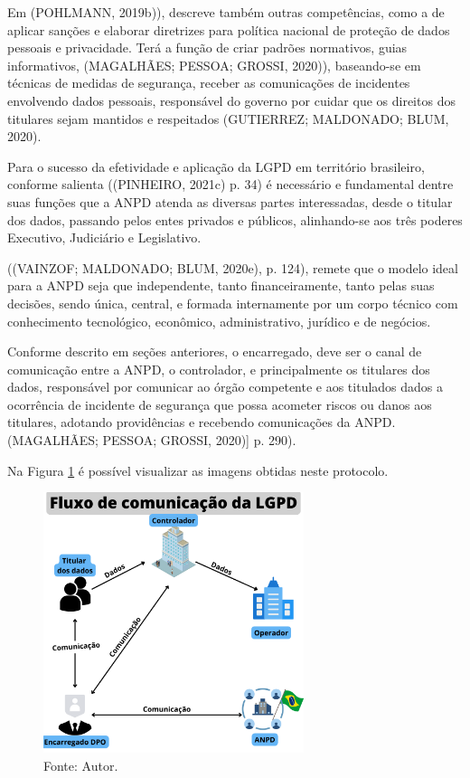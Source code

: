 \documentclass[
	12pt,				%
	openright,			%
	oneside,			%
	a4paper,			%
	english,			%
	french,				%
	spanish,			%
	brazil,				%
	]{abntex2}
\begin{document}
Em (POHLMANN, 2019b)), descreve também outras competências, como a de aplicar sanções e elaborar diretrizes para política nacional de proteção de dados pessoais e privacidade. Terá a função de criar padrões normativos, guias informativos,      (MAGALHÃES; PESSOA; GROSSI, 2020)), baseando-se em técnicas de medidas de segurança, receber as comunicações de incidentes envolvendo dados pessoais, responsável do governo por cuidar que os direitos dos titulares sejam mantidos e respeitados (GUTIERREZ; MALDONADO; BLUM, 2020).

Para o sucesso da efetividade e aplicação da LGPD em território brasileiro, conforme salienta ((PINHEIRO, 2021c) p. 34) é necessário e fundamental dentre suas funções que a ANPD atenda as diversas partes interessadas, desde o titular dos dados, passando pelos entes privados e públicos, alinhando-se aos três poderes Executivo, Judiciário e Legislativo.

((VAINZOF; MALDONADO; BLUM, 2020e), p. 124), remete que o modelo ideal para a ANPD seja que independente, tanto financeiramente, tanto pelas suas decisões, sendo única, central, e formada internamente por um corpo técnico com conhecimento tecnológico, econômico, administrativo, jurídico e de negócios.

Conforme descrito em seções anteriores, o encarregado, deve ser o canal de comunicação entre a ANPD, o controlador, e principalmente os titulares dos dados, responsável por comunicar ao órgão competente e aos titulados dados a ocorrência de incidente de segurança que possa acometer riscos ou danos aos titulares, adotando providências e recebendo comunicações da ANPD. (MAGALHÃES; PESSOA; GROSSI, 2020)] p. 290).

Na Figura \ref{fig: Fluxo } é possível visualizar as imagens obtidas neste protocolo.
\begin{figure}[ht]
    \centering
    \includegraphics[width=3.0in]{Images/04FluxoLGPD.png}
    \caption{Fonte: Autor.}
    \label{fig: Fluxo }
\end{figure}
\end{document}
